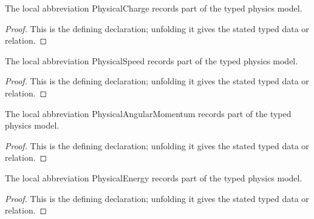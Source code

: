 \begin{definition}[PhysicalCharge]
  \label{decl:physics:IPhO_2026_1_B_1:PhysicalCharge}
  The local abbreviation PhysicalCharge records part of the typed physics model.
\end{definition}
\begin{proof}
  This is the defining declaration; unfolding it gives the stated typed data or relation.
\end{proof}

\begin{definition}[PhysicalSpeed]
  \label{decl:physics:IPhO_2026_1_B_1:PhysicalSpeed}
  The local abbreviation PhysicalSpeed records part of the typed physics model.
\end{definition}
\begin{proof}
  This is the defining declaration; unfolding it gives the stated typed data or relation.
\end{proof}

\begin{definition}[PhysicalAngularMomentum]
  \label{decl:physics:IPhO_2026_1_B_1:PhysicalAngularMomentum}
  The local abbreviation PhysicalAngularMomentum records part of the typed physics model.
\end{definition}
\begin{proof}
  This is the defining declaration; unfolding it gives the stated typed data or relation.
\end{proof}

\begin{definition}[PhysicalEnergy]
  \label{decl:physics:IPhO_2026_1_B_1:PhysicalEnergy}
  The local abbreviation PhysicalEnergy records part of the typed physics model.
\end{definition}
\begin{proof}
  This is the defining declaration; unfolding it gives the stated typed data or relation.
\end{proof}

